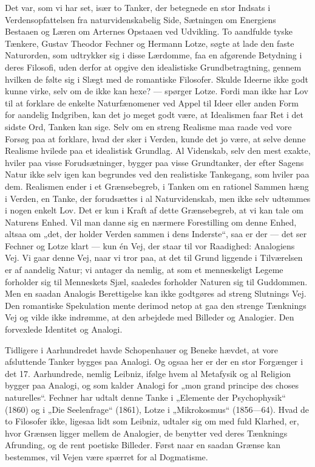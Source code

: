 \documentclass[12pt,a4paper,openany]{book}
\newcommand{\opage}[1]{\marginnote{\footnotesize\textit{[#1]}}}
\begin{document}
Det var, som vi har set, især to Tanker, der betegnede en stor Indsats
i Verdensopfattelsen fra naturvidenskabelig Side, Sætningen om
Energiens Bestaaen og Læren om Arternes Opstaaen ved Udvikling.
To aandfulde tyske Tænkere, Gustav Theodor Fechner og Hermann
Lotze, søgte at lade den faste Naturorden, som udtrykker sig
i disse Lærdomme, faa en afgørende Betydning i deres Filosofi, uden
derfor at opgive den idealistiske Grundbetragtning, gennem hvilken
de følte sig i Slægt med de romantiske Filosofer. Skulde Ideerne
ikke godt kunne virke, selv om de ikke kan hexe? --- spørger Lotze.
Fordi man ikke har Lov til at forklare de enkelte Naturfænomener
ved Appel til Ideer eller anden Form for aandelig Indgriben, kan det
jo meget godt være, at Idealismen faar Ret i det sidste Ord, Tanken
kan sige. Selv om en streng Realisme maa raade ved vore Forsøg
paa at forklare, hvad der sker i Verden, kunde det jo være, at selve
denne Realisme hvilede paa et idealistisk Grundlag. Al Videnskab,
selv den mest exakte, hviler paa visse Forudsætninger, bygger paa
visse Grundtanker, der efter Sagens Natur ikke selv igen kan begrundes
ved den realistiske Tankegang, som hviler paa dem. Realismen
ender i et Grænsebegreb, i Tanken om en rationel Sammen%
\opage{64}hæng i Verden, en Tanke, der forudsættes i al Naturvidenskab, men
ikke selv udtømmes i nogen enkelt Lov. Det er kun i Kraft af dette
Grænsebegreb, at vi kan tale om Naturens Enhed. Vil man danne
sig en nærmere Forestilling om denne Enhed, altsaa om „det, der
holder Verden sammen i dens Inderste“, saa er der --- det ser Fechner
og Lotze klart --- kun én Vej, der staar til vor Raadighed: Analogiens
Vej. Vi gaar denne Vej, naar vi tror paa, at det til Grund liggende
i Tilværelsen er af aandelig Natur; vi antager da nemlig, at
som et menneskeligt Legeme forholder sig til Menneskets Sjæl, saaledes
forholder Naturen sig til Guddommen. Men en saadan Analogis
Berettigelse kan ikke godtgøres ad streng Slutnings Vej. Den romantiske
Spekulation mente derimod netop at gaa den strenge Tænknings
Vej og vilde ikke indrømme, at den arbejdede med Billeder
og Analogier. Den forvexlede Identitet og Analogi.

Tidligere i Aarhundredet havde Schopenhauer og Beneke hævdet,
at vore afsluttende Tanker bygges paa Analogi. Og ogsaa her er der
en stor Forgænger i det 17. Aarhundrede, nemlig Leibniz, ifølge
hvem al Metafysik og al Religion bygger paa Analogi, og som kalder
Analogi for „mon grand principe des choses naturelles“. Fechner
har udtalt denne Tanke i „Elemente der Psychophysik“ (1860)
og i „Die Seelenfrage“ (1861), Lotze i „Mikrokosmus“ (1856---64).
Hvad de to Filosofer ikke, ligesaa lidt som Leibniz, udtaler sig om
med fuld Klarhed, er, hvor Grænsen ligger mellem de Analogier, de
benytter ved deres Tænknings Afrunding, og de rent poetiske Billeder.
Først naar en saadan Grænse kan bestemmes, vil Vejen være
spærret for al Dogmatisme.
\end{document}
